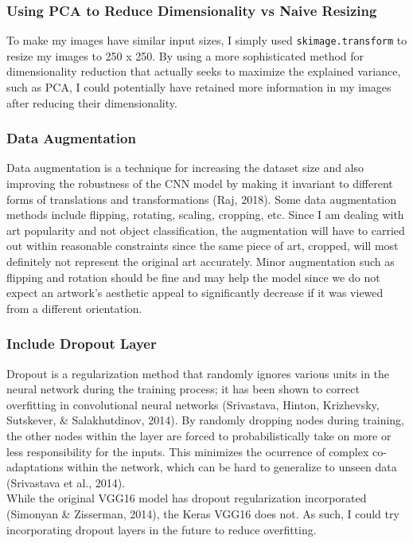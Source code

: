 \documentclass[11pt]{article}
\begin{document}
\subsubsection*{Using PCA to Reduce Dimensionality vs Naive Resizing}

To make my images have similar input sizes, I simply used
\texttt{skimage.transform} to resize my images to 250 x 250. By using a
more sophisticated method for dimensionality reduction that actually
seeks to maximize the explained variance, such as PCA, I could
potentially have retained more information in my images after reducing
their dimensionality.

\subsubsection*{Data Augmentation}

Data augmentation is a technique for increasing the dataset size and
also improving the robustness of the CNN model by making it invariant to
different forms of translations and transformations (Raj, 2018). Some
data augmentation methods include flipping, rotating, scaling, cropping,
etc. Since I am dealing with art popularity and not object
classification, the augmentation will have to carried out within
reasonable constraints since the same piece of art, cropped, will most
definitely not represent the original art accurately. Minor augmentation
such as flipping and rotation should be fine and may help the model
since we do not expect an artwork's aesthetic appeal to significantly
decrease if it was viewed from a different orientation.

\subsubsection*{Include Dropout Layer}

Dropout is a regularization method that randomly ignores various units
in the neural network during the training process; it has been shown to
correct overfitting in convolutional neural networks (Srivastava,
Hinton, Krizhevsky, Sutskever, \& Salakhutdinov, 2014). By randomly
dropping nodes during training, the other nodes within the layer are
forced to probabilistically take on more or less responsibility for the
inputs. This minimizes the ocurrence of complex co-adaptations within
the network, which can be hard to generalize to unseen data (Srivastava
et al., 2014).\\

While the original VGG16 model has dropout regularization incorporated
(Simonyan \& Zisserman, 2014), the Keras VGG16 does not. As such, I
could try incorporating dropout layers in the future to reduce
overfitting.
\end{document}
